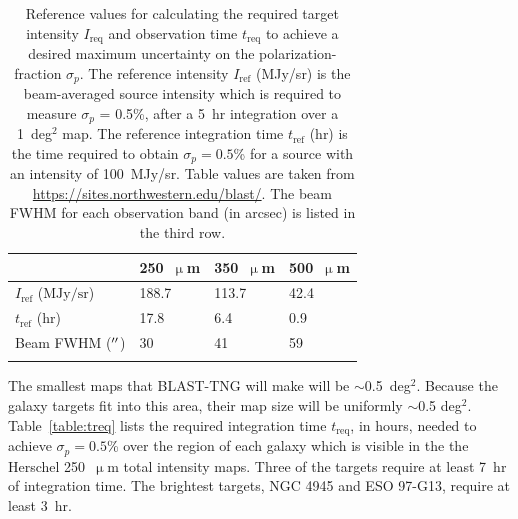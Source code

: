 \begin{table}[!htbp]
\centering
\begin{tabular}{@{}llll@{}}
\dtoprule
 & 250~$\upmu$m & 350~$\upmu$m & 500~$\upmu$m \\ \midrule
$I_{\mathrm{ref}}$ ($\mathrm{MJy/sr}$) & 188.7 & 113.7 & 42.4 \\
$t_{\mathrm{ref}}$ ($\mathrm{hr}$) & 17.8 & 6.4 & 0.9 \\
Beam FWHM ($\operatorname{^{\prime\prime}}$) & 30 & 41 & 59 \\ \bottomrule
\\
\end{tabular}
\caption[~Reference values for calculating the required target intensity  and observation time  to achieve a desired maximum uncertainty on the polarization-fraction .]{Reference values for calculating the required target intensity $I_{\mathrm{req}}$ and observation time $t_{\mathrm{req}}$ to achieve a desired maximum uncertainty on the polarization-fraction $\sigma_{p}$. The reference intensity $I_{\mathrm{ref}}$ (MJy/sr) is the beam-averaged source intensity which is required to measure $\sigma_{p}$ = 0.5\%, after a 5~hr integration over a 1~deg$^{2}$ map. The reference integration time $t_{\mathrm{ref}}$ (hr) is the time required to obtain $\sigma_{p} = 0.5$\% for a source with an intensity of 100~MJy/sr. Table values are taken from \url{https://sites.northwestern.edu/blast/}. The beam FWHM for each observation band (in arcsec) is listed in the third row.}
\label{table:map speed}
\end{table}

The smallest maps that BLAST-TNG will make will be $\sim$0.5~deg$^{2}$. Because the galaxy targets fit into this area, their map size will be uniformly $\sim$0.5 deg$^{2}$. Table~\ref{table:treq} lists the required integration time $t_{\mathrm{req}}$, in hours, needed to achieve $\sigma_{p} = 0.5$\% over the region of each galaxy which is visible in the the Herschel 250~$\upmu$m total intensity maps. Three of the targets require at least 7~hr of integration time. The brightest targets, NGC 4945 and ESO 97-G13, require at least 3~hr.

